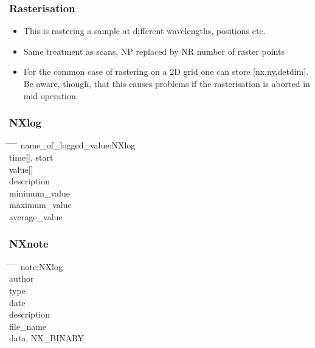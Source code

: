 \documentclass{beamer}
\begin{document}
\begin{frame}
\frametitle{Rasterisation}
\begin{itemize}
\item This is rastering a sample at different wavelengths, positions etc. 
\item Same treatment as scans, NP replaced by NR number of raster points
\item For the common case of rastering on a 2D grid one can store [nx,ny,detdim]. Be aware, though, that 
 this causes problems if the rasterisation is aborted in mid operation. 
\end{itemize}
\end{frame}

\begin{frame}
\frametitle{NXlog}
\begin{tabbing}
\hspace*{1cm} \= \hspace*{1cm} \= \hspace*{1cm} \= \hspace*{1cm} \= \kill
name\_of\_logged\_value:NXlog \\
  \> time[], start \\
  \>value[]\\
  \>description\\
  \>minimum\_value\\
  \>maximum\_value\\
  \>average\_value\\
\end{tabbing}
\end{frame}


\begin{frame}
\frametitle{NXnote}
\begin{tabbing}
\hspace*{1cm} \= \hspace*{1cm} \= \hspace*{1cm} \= \hspace*{1cm} \= \kill
note:NXlog \\
  \>author \\
  \>type\\
  \>date\\
  \>description\\
  \>file\_name\\
  \>data, NX\_BINARY\\
\end{tabbing}
\end{frame}
\end{document}
